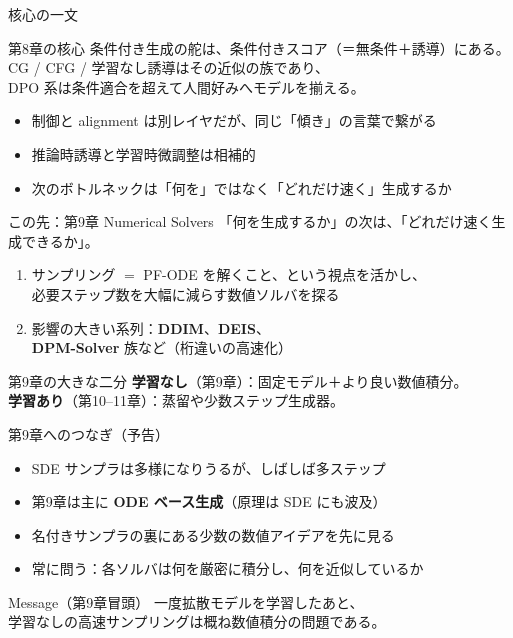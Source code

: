 \asmain
\begin{frame}{核心の一文}
    \begin{block}{第8章の核心}
        条件付き生成の舵は、条件付きスコア（＝無条件＋誘導）にある。\\
        CG / CFG / 学習なし誘導はその近似の族であり、\\
        DPO 系は条件適合を超えて人間好みへモデルを揃える。
    \end{block}
    \begin{itemize}
        \item 制御と alignment は別レイヤだが、同じ「傾き」の言葉で繋がる
        \item 推論時誘導と学習時微調整は相補的
        \item 次のボトルネックは「何を」ではなく「どれだけ速く」生成するか
    \end{itemize}
\end{frame}
\asmain
\begin{frame}{この先：第9章 Numerical Solvers}
    「何を生成するか」の次は、「どれだけ速く生成できるか」。
    \begin{enumerate}
        \item サンプリング $=$ PF-ODE を解くこと、という視点を活かし、\\
        必要ステップ数を大幅に減らす数値ソルバを探る
        \item 影響の大きい系列：\textbf{DDIM}、\textbf{DEIS}、\\
        \textbf{DPM-Solver} 族など（桁違いの高速化）
    \end{enumerate}
    \begin{exampleblock}{第9章の大きな二分}
        \textbf{学習なし}（第9章）：固定モデル＋より良い数値積分。\\
        \textbf{学習あり}（第10--11章）：蒸留や少数ステップ生成器。
    \end{exampleblock}
\end{frame}
\asmain
\begin{frame}{第9章へのつなぎ（予告）}
    \begin{itemize}
        \item SDE サンプラは多様になりうるが、しばしば多ステップ
        \item 第9章は主に \textbf{ODE ベース生成}（原理は SDE にも波及）
        \item 名付きサンプラの裏にある少数の数値アイデアを先に見る
        \item 常に問う：各ソルバは何を厳密に積分し、何を近似しているか
    \end{itemize}
    \begin{block}{Message（第9章冒頭）}
        一度拡散モデルを学習したあと、\\
        学習なしの高速サンプリングは概ね数値積分の問題である。
    \end{block}
\end{frame}
